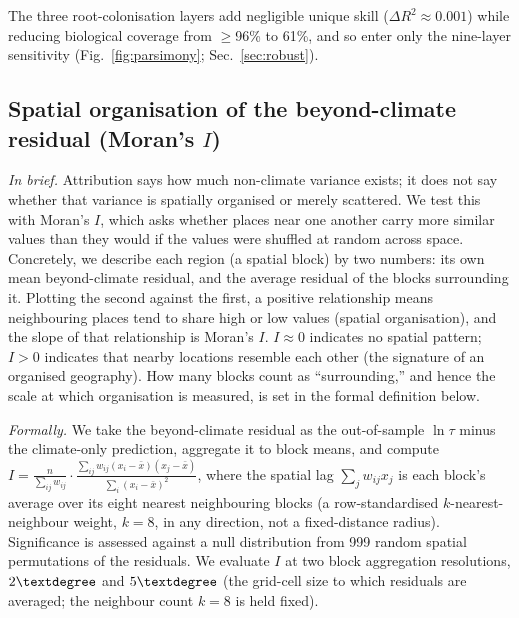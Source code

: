 \documentclass[12pt, a4paper]{article}
\begin{document}
The three \citet{Barcelo2023} root-colonisation layers add negligible unique skill
($\Delta R^2\approx0.001$) while reducing biological coverage from $\geq$96\% to
61\%, and so enter only the nine-layer sensitivity (Fig.~\ref{fig:parsimony};
Sec.~\ref{sec:robust}).

\subsection{Spatial organisation of the beyond-climate residual (Moran's $I$)}
\label{sec:moran}
\textit{In brief.} Attribution says how much non-climate variance exists; it does
not say whether that variance is spatially organised or merely scattered.
We test this with Moran's $I$, which asks whether places near one another carry
more similar values than they would if the values were shuffled at random across
space. Concretely, we describe each region (a spatial block) by two numbers: its
own mean beyond-climate residual, and the average residual of the blocks
surrounding it. Plotting the second against the first, a positive relationship
means neighbouring places tend to share high or low values (spatial
organisation), and the slope of that relationship is Moran's $I$. $I\approx0$
indicates no spatial pattern; $I>0$ indicates that nearby locations resemble
each other (the signature of an organised geography). How many blocks count as
``surrounding,'' and hence the scale at which organisation is measured, is set
in the formal definition below.

\textit{Formally.} We take the beyond-climate residual as the out-of-sample
$\ln\tau$ minus the climate-only prediction, aggregate it to block means, and
compute
$I=\frac{n}{\sum_{ij}w_{ij}}\cdot
\frac{\sum_{ij}w_{ij}(x_i-\bar x)(x_j-\bar x)}{\sum_i (x_i-\bar x)^2}$,
where the spatial lag $\sum_j w_{ij}x_j$ is each block's average over its eight nearest
neighbouring blocks (a row-standardised $k$-nearest-neighbour weight, $k=8$, in any
direction, not a fixed-distance radius).
Significance is assessed against a null distribution from 999 random spatial
permutations of the residuals. We evaluate $I$ at two block aggregation
resolutions, $2\textdegree$ and $5\textdegree$ (the grid-cell size to which
residuals are averaged; the neighbour count $k=8$ is held fixed).

\end{document}
